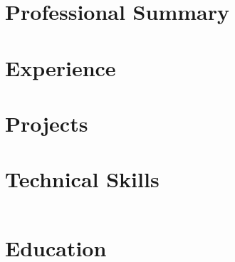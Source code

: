 \documentclass[a4paper,9pt]{article}
\begin{document}

\section{Professional Summary}

\section{Experience}


\section{Projects}


\section{Technical Skills}
\begin{tabular}{@{}p{3.4cm}p{14.6cm}@{}}
\end{tabular}

\section{Education}

\end{document}

